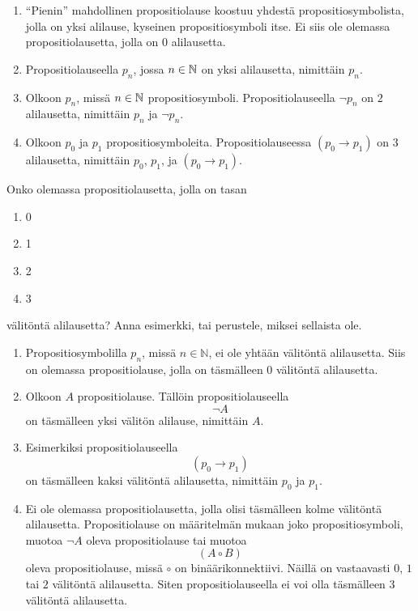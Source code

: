 \documentclass[12pt,a4paper]{article}
\begin{document}
\begin{solution}
\leavevmode\par
\begin{enumerate}[label=\alph*), nosep]
\item ``Pienin'' mahdollinen propositiolause koostuu yhdestä
propositiosymbolista, jolla on yksi alilause, kyseinen propositiosymboli
itse. Ei siis ole olemassa propositiolausetta, jolla on \(0\) alilausetta.
\item Propositiolauseella \(p_n\), jossa \(n \in \mathbb{N}\) on yksi alilausetta,
nimittäin \(p_n\).
\item Olkoon \(p_n\), missä \(n \in \mathbb{N}\) propositiosymboli. Propositiolauseella
\(\neg p_n\) on \(2\) alilausetta, nimittäin \(p_n\) ja \(\neg p_n\).
\item Olkoon \(p_0\) ja \(p_1\) propositiosymboleita. Propositiolauseessa
\((p_0 \rightarrow p_1)\) on \(3\) alilausetta, nimittäin
\(p_0\), \(p_1\), ja \((p_0 \rightarrow p_1)\).
\end{enumerate}
\end{solution}

\begin{exercise}
Onko olemassa propositiolausetta, jolla on tasan
\begin{enumerate}[label=\alph*), nosep]
\item 0
\item 1
\item 2
\item 3
\end{enumerate}
välitöntä alilausetta? Anna esimerkki, tai perustele, miksei sellaista ole.
\end{exercise}

\begin{solution}
\leavevmode\par
\begin{enumerate}[label=\alph*), nosep]
\item Propositiosymbolilla \(p_n\), missä \(n \in \mathbb{N}\), ei ole
yhtään välitöntä alilausetta. Siis on olemassa propositiolause, jolla on
täsmälleen \(0\) välitöntä alilausetta.

\item Olkoon \(A\) propositiolause. Tällöin propositiolauseella
\[
\neg A
\]
on täsmälleen yksi välitön alilause, nimittäin \(A\).

\item Esimerkiksi propositiolauseella
\[
(p_0 \to p_1)
\]
on täsmälleen kaksi välitöntä alilausetta, nimittäin \(p_0\) ja \(p_1\).

\item Ei ole olemassa propositiolausetta, jolla olisi täsmälleen kolme
välitöntä alilausetta. Propositiolause on määritelmän mukaan joko
propositiosymboli, muotoa \(\neg A\) oleva propositiolause tai muotoa
\[
(A \mathbin{\circ} B)
\]
oleva propositiolause, missä \(\circ\) on binäärikonnektiivi. Näillä on
vastaavasti \(0\), \(1\) tai \(2\) välitöntä alilausetta. Siten
propositiolauseella ei voi olla täsmälleen \(3\) välitöntä alilausetta.
\end{enumerate}
\end{solution}
\end{document}
